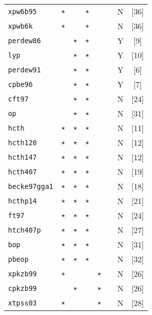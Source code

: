 \begin{table}[htp]
{\begin{tabular}{|l|p{0.12cm}p{0.12cm}cccp{0.35cm}|c|}
{\tt  xpw6b95  }& $\star$  &             &  $\star$  &   &        &  N   &[36]\\
{\tt  xpwb6k   }& $\star$  &             &  $\star$  &   &        &  N   &[36]\\
\hline                                                  
{\tt  perdew86 }&          &   $\star$   &  $\star$  &   &       &  Y   &[9]\\
{\tt  lyp      }&          &   $\star$   &  $\star$  &   &       &  Y   &[10]\\
{\tt  perdew91 }&          &   $\star$   &  $\star$  &   &       &  Y   &[6]\\
{\tt  cpbe96   }&          &   $\star$   &  $\star$  &   &       &  Y   &[7]\\
{\tt  cft97    }&          &   $\star$   &  $\star$  &   &       &  N   &[24]\\
{\tt  op       }&          &   $\star$   &  $\star$  &   &       &  N   &[31]\\
\hline                                                  
{\tt  hcth     }& $\star$  &   $\star$   &  $\star$  &   &       &  N   &[11]\\
{\tt  hcth120  }& $\star$  &   $\star$   &  $\star$  &   &       &  N   &[12]\\
{\tt  hcth147  }& $\star$  &   $\star$   &  $\star$  &   &       &  N   &[12]\\
{\tt  hcth407  }& $\star$  &   $\star$   &  $\star$  &   &       &  N   &[19]\\
{\tt  becke97gga1}& $\star$ &   $\star$   &  $\star$  &   &       &  N   &[18]\\
{\tt  hcthp14  }& $\star$  &   $\star$   &  $\star$  &   &       &  N   &[21]\\
{\tt  ft97     }& $\star$  &   $\star$   &  $\star$  &   &       &  N   &[24]\\
{\tt  htch407p }& $\star$  &   $\star$   &  $\star$  &   &       &  N   &[27]\\
{\tt  bop      }& $\star$  &   $\star$   &  $\star$  &   &       &  N   &[31]\\
{\tt  pbeop    }& $\star$  &   $\star$   &  $\star$  &   &       &  N   &[32]\\
\hline                                                  
{\tt  xpkzb99  }& $\star$  &             &           &$\star$&   &  N   &[26]\\
{\tt  cpkzb99  }&          &  $\star$    &           &$\star$&   &  N   &[26]\\
{\tt  xtpss03  }& $\star$  &             &           &$\star$&   &  N   &[28]\\

\end{tabular}}
\end{table}
